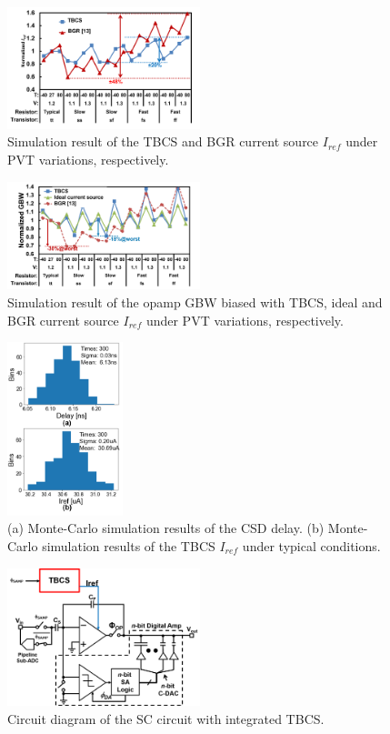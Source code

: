 \documentclass[paper]{ieice}
\begin{document}
\begin{figure}[!t]
\centering
 \includegraphics[width=0.5\textwidth]{figs/pvt.png}
  \caption{Simulation result of the TBCS and BGR current source $I_{ref}$ under PVT variations, respectively.
}
\label{iref_pvt_both}
\end{figure}

\begin{figure}[!t]
\centering
 \includegraphics[width=0.5\textwidth]{figs/pvt_gbw.png}
  \caption{Simulation result of the opamp GBW biased with TBCS, ideal and BGR current source $I_{ref}$ under PVT variations, respectively.
}
\label{iref_gbw}
\end{figure}

\begin{figure}[!t]
\centering
 \includegraphics[width=0.3\textwidth]{figs/mc.png}
  \caption{(a) Monte-Carlo simulation results of the CSD delay. (b) Monte-Carlo simulation results of the TBCS $I_{ref}$ under typical conditions.
}
\label{monte}
\end{figure}

\begin{figure}[!t]
\centering
 \includegraphics[width=0.5\textwidth]{figs/switchcap.png}
  \caption{Circuit diagram of the SC circuit with integrated TBCS.}
\label{scap}
\end{figure}
\end{document}
